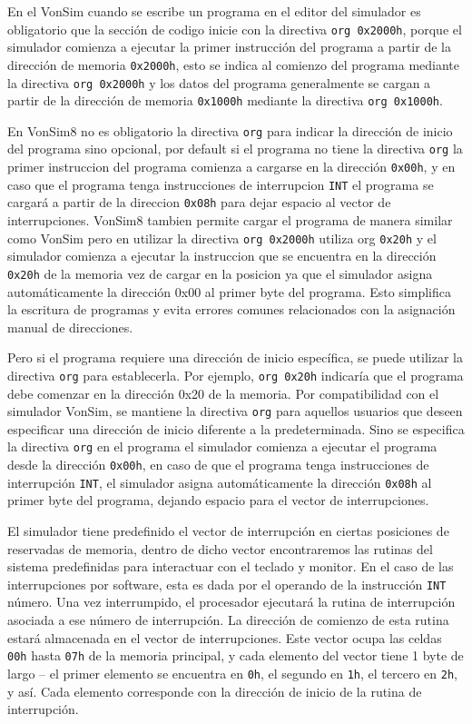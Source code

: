 \documentclass[12pt,oneside]{templates/unerthesis}
\begin{document}
En el VonSim cuando se escribe un programa en el editor del simulador es obligatorio que la sección de codigo inicie con la directiva \texttt{org\ 0x2000h}, porque el simulador comienza a ejecutar la primer instrucción del programa a partir de la dirección de memoria \texttt{0x2000h}, esto se indica al comienzo del programa mediante la directiva \texttt{org\ 0x2000h} y los datos del programa generalmente se cargan a partir de la dirección de memoria \texttt{0x1000h} mediante la directiva \texttt{org\ 0x1000h}.

En VonSim8 no es obligatorio la directiva \texttt{org} para indicar la dirección de inicio del programa sino opcional, por default si el programa no tiene la directiva \texttt{org} la primer instruccion del programa comienza a cargarse en la dirección \texttt{0x00h}, y en caso que el programa tenga instrucciones de interrupcion \texttt{INT} el programa se cargará a partir de la direccion \texttt{0x08h} para dejar espacio al vector de interrupciones.
VonSim8 tambien permite cargar el programa de manera similar como VonSim pero en utilizar la directiva \texttt{org\ 0x2000h} utiliza org \texttt{0x20h} y el simulador comienza a ejecutar la instruccion que se encuentra en la dirección \texttt{0x20h} de la memoria vez de cargar en la posicion ya que el simulador asigna automáticamente la dirección 0x00 al primer byte del programa. Esto simplifica la escritura de programas y evita errores comunes relacionados con la asignación manual de direcciones.

Pero si el programa requiere una dirección de inicio específica, se puede utilizar la directiva \texttt{org} para establecerla. Por ejemplo, \texttt{org\ 0x20h} indicaría que el programa debe comenzar en la dirección 0x20 de la memoria. Por compatibilidad con el simulador VonSim, se mantiene la directiva \texttt{org} para aquellos usuarios que deseen especificar una dirección de inicio diferente a la predeterminada. Sino se especifica la directiva \texttt{org} en el programa el simulador comienza a ejecutar el programa desde la dirección \texttt{0x00h}, en caso de que el programa tenga instrucciones de interrupción \texttt{INT}, el simulador asigna automáticamente la dirección \texttt{0x08h} al primer byte del programa, dejando espacio para el vector de interrupciones.

El simulador tiene predefinido el vector de interrupción en ciertas posiciones de reservadas de memoria, dentro de dicho vector encontraremos las rutinas del sistema predefinidas para interactuar con el teclado y monitor.
En el caso de las interrupciones por software, esta es dada por el operando de la instrucción \texttt{INT} número. Una vez interrumpido, el procesador ejecutará la rutina de interrupción asociada a ese número de interrupción. La dirección de comienzo de esta rutina estará almacenada en el vector de interrupciones. Este vector ocupa las celdas \texttt{00h} hasta \texttt{07h} de la memoria principal, y cada elemento del vector tiene 1 byte de largo -- el primer elemento se encuentra en \texttt{0h}, el segundo en \texttt{1h}, el tercero en \texttt{2h}, y así. Cada elemento corresponde con la dirección de inicio de la rutina de interrupción.
\end{document}

